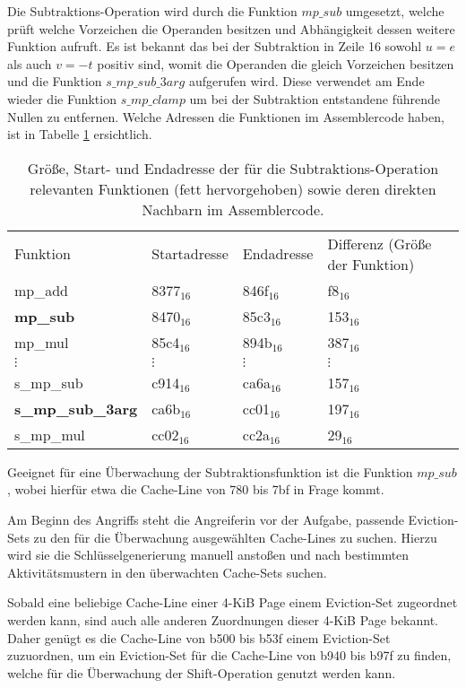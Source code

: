 Die Subtraktions-Operation wird durch die Funktion $mp\_sub$ umgesetzt, welche prüft welche Vorzeichen die Operanden besitzen und Abhängigkeit dessen weitere Funktion aufruft.
Es ist bekannt das bei der Subtraktion in Zeile 16 sowohl $u=e$ als auch $v=-t$ positiv sind, womit die Operanden die gleich Vorzeichen besitzen und die Funktion $s\_mp\_sub\_3arg$ aufgerufen wird.
Diese verwendet am Ende wieder die Funktion $s\_mp\_clamp$ um bei der Subtraktion entstandene führende Nullen zu entfernen.
Welche Adressen die Funktionen im Assemblercode haben, ist in Tabelle \ref{tbl:assOffsetSub} ersichtlich. 


\begin{table}[h]
\caption{Größe, Start- und Endadresse der für die Subtraktions-Operation relevanten Funktionen (fett hervorgehoben) sowie deren direkten Nachbarn im Assemblercode.}
\label{tbl:assOffsetSub}
\begin{tabular}{llll}
Funktion         & Startadresse & Endadresse & Differenz (Größe der Funktion) \\
mp\_add & 8377$_{16}$ & 846f$_{16}$ & f8$_{16}$\\
\textbf{mp\_sub} & 8470$_{16}$ & 85c3$_{16}$ & 153$_{16}$ \\
mp\_mul & 85c4$_{16}$ & 894b$_{16}$ & 387$_{16}$ \\
$\vdots$               &  $\vdots$             &    $\vdots$         &     $\vdots$   \\
s\_mp\_sub       & c914$_{16}$         & ca6a$_{16}$       & 157$_{16}$   \\
\textbf{s\_mp\_sub\_3arg} & ca6b$_{16}$         & cc01$_{16}$       & 197$_{16}$   \\
s\_mp\_mul       & cc02$_{16}$         & cc2a$_{16}$       & 29$_{16}$   
\end{tabular}
\end{table}

Geeignet für eine Überwachung der Subtraktionsfunktion ist die Funktion $mp\_sub$, wobei hierfür etwa die Cache-Line von 780 bis 7bf in Frage kommt.

Am Beginn des Angriffs steht die Angreiferin vor der Aufgabe, passende Eviction-Sets zu den für die Überwachung ausgewählten Cache-Lines zu suchen.
Hierzu wird sie die Schlüsselgenerierung manuell anstoßen und nach bestimmten Aktivitätsmustern in den überwachten Cache-Sets suchen.

Sobald eine beliebige Cache-Line einer 4-KiB Page einem Eviction-Set zugeordnet werden kann, sind auch alle anderen Zuordnungen dieser 4-KiB Page bekannt.
Daher genügt es die Cache-Line von b500 bis b53f einem Eviction-Set zuzuordnen, um ein Eviction-Set für die Cache-Line von b940 bis b97f zu finden, welche für die Überwachung der Shift-Operation genutzt werden kann.

